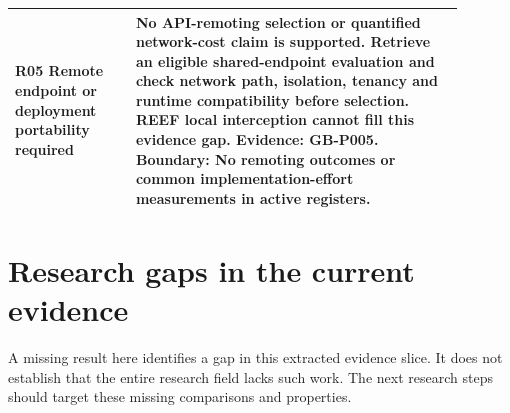 \documentclass[12pt,a4paper]{article}
\begin{document}
\begin{longtable}{p{0.24\linewidth}p{0.65\linewidth}}
R05 Remote endpoint or deployment portability required & No API-remoting selection or quantified network-cost claim is supported. Retrieve an eligible shared-endpoint evaluation and check network path, isolation, tenancy and runtime compatibility before selection. REEF local interception cannot fill this evidence gap. Evidence: GB-P005. Boundary: No remoting outcomes or common implementation-effort measurements in active registers.\\
\bottomrule
\end{longtable}

\section{Research gaps in the current evidence}
A missing result here identifies a gap in this extracted evidence slice. It does not establish that the entire research field lacks such work. The next research steps should target these missing comparisons and properties.
\end{document}
